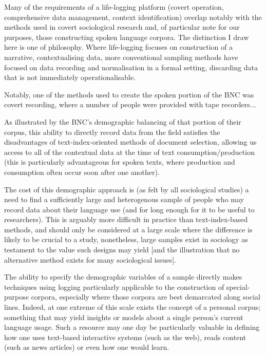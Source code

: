 Many of the requirements of a life-logging platform (covert operation, comprehensive data management, context identification) overlap notably with the methods used in covert sociological research and, of particular note for our purposes, those constructing spoken language corpora.  The distinction I draw here is one of philosophy.  Where life-logging focuses on construction of a narrative, contextualising data, more conventional sampling methods have focused on data recording and normalisation in a formal setting, discarding data that is not immediately operationalisable.


Notably, one of the methods used to create the spoken portion of the BNC was covert recording, where a number of people were provided with tape recorders...

As illustrated by the BNC's demographic balancing of that portion of their corpus, this ability to directly record data from the field satisfies the disadvantages of text-index-oriented methods of document selection, allowing us access to all of the contextual data at the time of text consumption/production (this is particularly advantageous for spoken texts, where production and consumption often occur soon after one another).

The cost of this demographic approach is (as felt by all sociological studies) a need to find a sufficiently large and heterogenous sample of people who may record data about their language use (and for long enough for it to be useful to researchers).  This is arguably more difficult in practice than text-index-based methods, and should only be considered at a large scale where the difference is likely to be crucial to a study, nonetheless, large samples exist in sociology as testament to the value such designs may yield [and the illustration that no alternative method exists for many sociological issues].

The ability to specify the demographic variables of a sample directly makes techniques using logging particularly applicable to the construction of special-purpose corpora, especially where those corpora are best demarcated along social lines.  Indeed, at one extreme of this scale exists the concept of a personal corpus; something that may yield insights or models about a single person's current language usage.  Such a resource may one day be particularly valuable in defining how one uses text-based interactive systems (such as the web), reads content (such as news articles) or even how one would learn.

